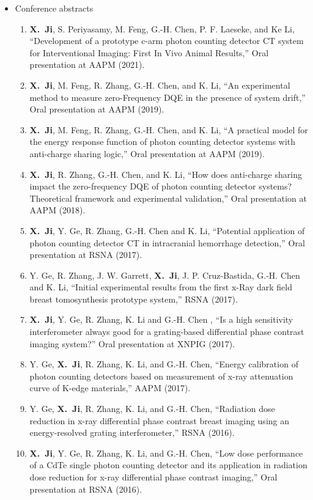 \documentclass[letterpaper,11pt]{article}
\newcommand{\xji}{\textbf{X.~Ji}}
\begin{document}
\begin{itemize}
\item Conference abstracts 
\begin{enumerate}\justifying
\item \xji, S. Periyasamy, M. Feng, G.-H. Chen, P. F. Laeseke, and Ke Li, ``Development of a prototype c-arm photon counting detector CT system for Interventional Imaging: First In Vivo Animal Results,'' Oral presentation at AAPM (2021).

\item \xji, M. Feng, R. Zhang, G.-H. Chen, and K. Li, ``An experimental method to measure zero-Frequency DQE in the presence of system drift,'' Oral presentation at AAPM (2019).

\item \xji, M. Feng, R. Zhang, G.-H. Chen, and K. Li, ``A practical model for the energy response function of photon counting detector systems with anti-charge sharing logic,'' Oral presentation at AAPM (2019).

\item \xji, R. Zhang, G.-H. Chen, and K. Li, ``How does anti-charge sharing impact the zero-frequency DQE of photon counting detector systems? Theoretical framework and experimental validation,'' Oral presentation at AAPM (2018).

\item \xji, Y. Ge, R. Zhang, G.-H. Chen and K. Li, ``Potential application of photon counting detector CT in intracranial hemorrhage detection,'' Oral presentation at RSNA (2017).

\item Y. Ge, R. Zhang, J. W. Garrett, \xji, J. P. Cruz-Bastida, G.-H. Chen and K. Li, ``Initial experimental results from the first x-Ray dark field breast tomosynthesis prototype system,'' RSNA (2017).

\item \xji, Y. Ge, R. Zhang, K. Li and G.-H. Chen , ``Is a high sensitivity interferometer always good for a grating-based differential phase contrast imaging system?'' Oral presentation at XNPIG (2017).

\item Y. Ge, \xji, R. Zhang, K. Li, and G.-H. Chen, ``Energy calibration of photon counting detectors based on measurement of x-ray attenuation curve of K-edge materials,'' AAPM (2017).

\item Y. Ge, \xji, R. Zhang, K. Li, and G.-H. Chen, ``Radiation dose reduction in x-ray differential phase contrast breast imaging using an energy-resolved grating interferometer,'' RSNA (2016).

\item \xji, Y. Ge, R. Zhang, K. Li, and G.-H. Chen, ``Low dose performance of a CdTe single photon counting detector and its application in radiation dose reduction for x-ray differential phase contrast imaging,'' Oral presentation at RSNA (2016).
\end{enumerate}
\end{itemize}
\end{document}
